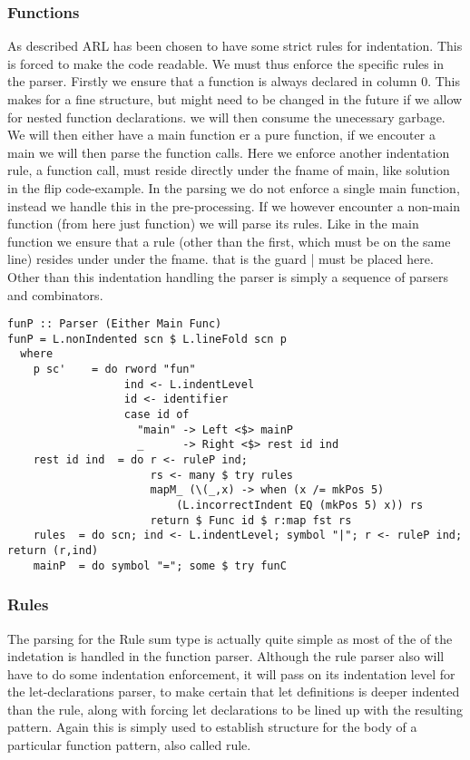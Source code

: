 \documentclass[a4paper]{article}
\begin{document}
\subsubsection{Functions}
\label{sec:orgce7011c}
As described ARL has been chosen to have some strict rules for indentation. This is forced to make the code readable. We must thus enforce the specific rules in the parser. Firstly we ensure that a function is always declared in column 0. This makes for a fine structure, but might need to be changed in the future if we allow for nested function declarations. we will then consume the unecessary garbage. We will then either have a main function er a pure function, if we encouter a main we will then parse the function calls. Here we enforce another indentation rule, a function call, must reside directly under the fname of main, like solution in the flip code-example. In the parsing we do not enforce a single main function, instead we handle this in the pre-processing.
If we however encounter a non-main function (from here just function) we will parse its rules. Like in the main function we ensure that a rule (other than the first, which must be on the same line) resides under under the fname. that is the guard | must be placed here. Other than this indentation handling the parser is simply a sequence of parsers and combinators.
\begin{verbatim}
funP :: Parser (Either Main Func)
funP = L.nonIndented scn $ L.lineFold scn p
  where
    p sc'    = do rword "fun"
                  ind <- L.indentLevel
                  id <- identifier
                  case id of
                    "main" -> Left <$> mainP
                    _      -> Right <$> rest id ind
    rest id ind  = do r <- ruleP ind;
                      rs <- many $ try rules
                      mapM_ (\(_,x) -> when (x /= mkPos 5)
                          (L.incorrectIndent EQ (mkPos 5) x)) rs
                      return $ Func id $ r:map fst rs
    rules  = do scn; ind <- L.indentLevel; symbol "|"; r <- ruleP ind; return (r,ind)
    mainP  = do symbol "="; some $ try funC
\end{verbatim}
\subsubsection{Rules}
\label{sec:orgeed8af3}
The parsing for the Rule sum type is actually quite simple as most of the of the indetation is handled in the function parser. Although the rule parser also will have to do some indentation enforcement, it will pass on its indentation level for the let-declarations parser, to make certain that let definitions is deeper indented than the rule, along with forcing let declarations to be lined up with the resulting pattern. Again this is simply used to establish structure for the body of a particular function pattern, also called rule.
\end{document}
